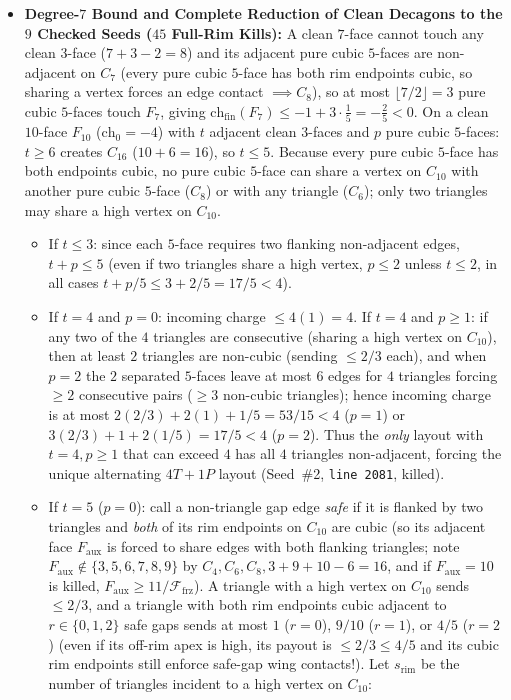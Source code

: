 \documentclass[11pt,reqno]{amsart}
\theoremstyle{plain}
\theoremstyle{definition}
\theoremstyle{remark}
\newcommand{\chz}{\mathrm{ch}_0}
\newcommand{\chf}{\mathrm{ch}_{\mathrm{fin}}}
\newcommand{\Ffrz}{\mathcal{F}_{\mathrm{frz}}}
\DeclareRobustCommand{\_}{\ifmmode\text{\textunderscore}\else\textunderscore\allowbreak\fi}
\begin{document}
\begin{itemize}[leftmargin=1.8em]
  \item \textbf{Degree-$7$ Bound and Complete Reduction of Clean Decagons to the $9$ Checked Seeds ($45$ Full-Rim Kills):} A clean $7$-face cannot touch any clean $3$-face ($7+3-2=8$) and its adjacent pure cubic $5$-faces are non-adjacent on $C_7$ (every pure cubic $5$-face has both rim endpoints cubic, so sharing a vertex forces an edge contact $\implies C_8$), so at most $\lfloor 7/2 \rfloor = 3$ pure cubic $5$-faces touch $F_7$, giving $\chf(F_7) \le -1 + 3 \cdot \frac{1}{5} = -\frac{2}{5} < 0$. On a clean $10$-face $F_{10}$ ($\chz = -4$) with $t$ adjacent clean $3$-faces and $p$ pure cubic $5$-faces: $t \ge 6$ creates $C_{16}$ ($10+6=16$), so $t \le 5$. Because every pure cubic $5$-face has both endpoints cubic, no pure cubic $5$-face can share a vertex on $C_{10}$ with another pure cubic $5$-face ($C_8$) or with any triangle ($C_6$); only two triangles may share a high vertex on $C_{10}$.
  \begin{itemize}[leftmargin=1.4em]
    \item If $t \le 3$: since each $5$-face requires two flanking non-adjacent edges, $t + p \le 5$ (even if two triangles share a high vertex, $p \le 2$ unless $t \le 2$, in all cases $t + p/5 \le 3 + 2/5 = 17/5 < 4$).
    \item If $t = 4$ and $p = 0$: incoming charge $\le 4(1) = 4$. If $t = 4$ and $p \ge 1$: if any two of the $4$ triangles are consecutive (sharing a high vertex on $C_{10}$), then at least $2$ triangles are non-cubic (sending $\le 2/3$ each), and when $p = 2$ the $2$ separated $5$-faces leave at most $6$ edges for $4$ triangles forcing $\ge 2$ consecutive pairs ($\ge 3$ non-cubic triangles); hence incoming charge is at most $2(2/3) + 2(1) + 1/5 = 53/15 < 4$ ($p = 1$) or $3(2/3) + 1 + 2(1/5) = 17/5 < 4$ ($p = 2$). Thus the \emph{only} layout with $t = 4, p \ge 1$ that can exceed $4$ has all $4$ triangles non-adjacent, forcing the unique alternating $4T + 1P$ layout (Seed~\#2, \texttt{line 2081}, killed).
    \item If $t = 5$ ($p = 0$): call a non-triangle gap edge \emph{safe} if it is flanked by two triangles and \emph{both} of its rim endpoints on $C_{10}$ are cubic (so its adjacent face $F_{\mathrm{aux}}$ is forced to share edges with both flanking triangles; note $F_{\mathrm{aux}} \notin \{3, 5, 6, 7, 8, 9\}$ by $C_4, C_6, C_8, 3+9+10-6=16$, and if $F_{\mathrm{aux}} = 10$ is killed, $F_{\mathrm{aux}} \ge 11/\Ffrz$). A triangle with a high vertex on $C_{10}$ sends $\le 2/3$, and a triangle with both rim endpoints cubic adjacent to $r \in \{0, 1, 2\}$ safe gaps sends at most $1$ ($r=0$), $9/10$ ($r=1$), or $4/5$ ($r=2$) (even if its off-rim apex is high, its payout is $\le 2/3 \le 4/5$ and its cubic rim endpoints still enforce safe-gap wing contacts!). Let $s_{\mathrm{rim}}$ be the number of triangles incident to a high vertex on $C_{10}$:

\end{itemize}
\end{itemize}
\end{document}
